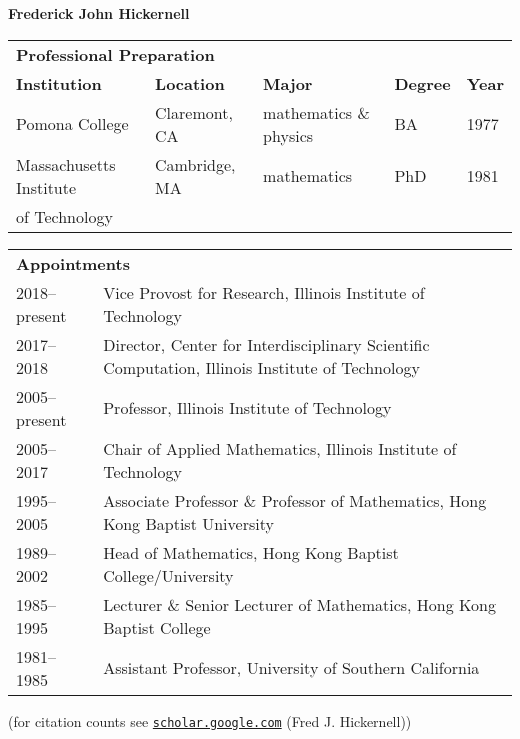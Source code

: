 \documentclass[11 pt]{NSFamsart}
\begin{document}
\centerline{\Large \bf Frederick John Hickernell}

\medskip

\noindent
\begin{tabular}{lllll}
	\multicolumn{5}{l}{{\large\textbf{Professional Preparation}}} \\
	\textbf{Institution} & \textbf{Location} & \textbf{Major} & \textbf{Degree} & \textbf{Year} \\
	Pomona College & Claremont, CA & mathematics \& physics & BA & 1977 \\
	Massachusetts Institute  & Cambridge, MA &  mathematics  &  PhD &1981 \\
	\hspace{3cm} of Technology
\end{tabular}

\bigskip

\noindent
\begin{tabular}{lp{13.5cm}}
	\multicolumn{2}{l}{{\large\textbf{Appointments}}} \\
	2018--present & Vice Provost for Research, Illinois Institute of Technology \\
2017--2018 & Director, Center for Interdisciplinary Scientific Computation, Illinois Institute of 
Technology \\ 
2005--present & Professor, Illinois Institute of Technology \\ 
2005--2017 & Chair of Applied Mathematics, Illinois Institute of Technology \\ 
1995--2005  &  Associate Professor \& Professor of Mathematics, Hong Kong Baptist
University\\ 
1989--2002 & Head of Mathematics, Hong Kong Baptist College/University \\ 
1985--1995 &  Lecturer \& Senior Lecturer of Mathematics, Hong Kong Baptist College \\
1981--1985 & Assistant Professor, University of Southern California
\end{tabular}

\bigskip

 (for citation counts see 
\href{http://scholar.google.com/citations?user=dJbMJG8AAAAJ}{\nolinkurl{scholar.google.com}} 
(Fred J. Hickernell))
\end{document}
